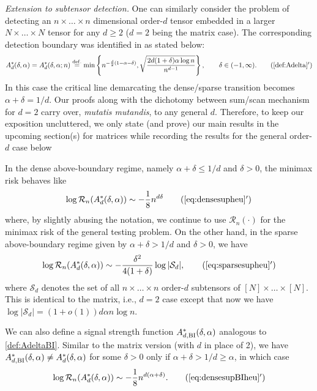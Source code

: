 \documentclass[11pt,reqno,letterpaper]{amsart}
\numberwithin{equation}{section}
\theoremstyle{plain}
\begin{document}
\smallskip

\noindent\emph{Extension to subtensor detection.} One can similarly consider 
the problem of detecting an $n \times \ldots \times n$ dimensional order-$d$ tensor embedded in a larger $N \times \ldots \times N$ tensor for any $d \ge 2$ ($d = 2$ being the matrix case). The corresponding detection boundary was identified in \cite{MR4382029} as stated below:
 \begin{equation}\label{def:Adelta_tensor}
A^\ast_d(\delta, \alpha) = A^\ast_d(\delta, \alpha; n)\stackrel{{\rm def.}}{=}
\min\left\{n^{-\frac d2(1-\alpha-\delta)},
\sqrt{\frac{2d(1+\delta)\alpha\log n}{n^{d-1}}}\right\},
\qquad \delta\in(-1,\infty).
\tag{\ref{def:Adelta}$'$}
\end{equation}
In this case the critical line demarcating the dense/sparse transition becomes 
$\alpha + \delta = 1/d$. Our proofs along with the dichotomy between sum/scan 
mechanism for $d = 2$ carry over, {\em mutatis mutandis}, to any general $d$. 
Therefore, to keep our exposition uncluttered, we only state (and prove) our main results in 
the upcoming section(s) for matrices while recording the results for the general 
order-$d$ case below


In the dense above-boundary regime, namely $\alpha + \delta \le 1/d$ and $\delta > 
0$, the minimax risk behaves like 
\begin{equation}\label{eq:densesupheud}
\log\mathcal R_n(A^\ast_d(\delta, \alpha)) \sim -\frac18 n^{d\delta}
\tag{\ref{eq:densesupheu}$'$}
\end{equation}
where, by slightly abusing the notation, we continue to use $\mathcal R_n( \cdot )$ for the minimax risk of the general testing problem. On the other hand, in the sparse above-boundary 
regime given by $\alpha + \delta > 1/d$ and $\delta > 0$, we have
\begin{equation}\label{eq:sparsesupheud}
\log\mathcal R_n(A^\ast_d(\delta, \alpha)) \sim -\frac{\delta^2}{4(1+\delta)} \log |\mathcal S_d|,    
\tag{\ref{eq:sparsesupheu}$'$}
\end{equation}
where $\mathcal S_d$ denotes the set of all $n\times \ldots \times n$ order-$d$ 
subtensors of $[N] \times \ldots \times [N]$. This is identical to the matrix, i.e., $d = 2$ case except that now we have $\log|\mathcal S_d|=(1+o(1))d\alpha n\log n$. 

We can also define a signal strength function $A^\ast_{d, {\rm BI}}(\delta, \alpha)$ 
analogous to \eqref{def:AdeltaBI}. Similar to the matrix version (with $d$ in place of 2), we have $A^\ast_{d, {\rm BI}}(\delta, \alpha) \ne A^\ast_{d}(\delta, \alpha)$ for some $\delta > 0$ only if $\alpha + \delta > 1/d \ge \alpha$, in which case 
\begin{equation}\label{eq:densesupBIheud}
\log\mathcal R_n(A^\ast_d(\delta, \alpha))\sim -\frac18 n^{d(\alpha+\delta)}.
\tag{\ref{eq:densesupBIheu}$'$}
\end{equation}
\end{document}
